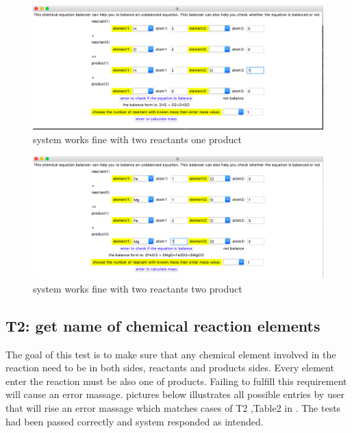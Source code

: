 \documentclass[12pt, titlepage]{article}
\begin{document}
 \begin{figure}[h!]
 \begin{center}
 \includegraphics [width=\textwidth]{ElementNumber3}
 \caption{\label{ Figure 3:} system works fine with two reactants one product}
 \end{center}
 \end{figure}
 
 \begin{figure}[h!]
 \begin{center}
 \includegraphics [width=\textwidth]{ElementNumber4}
 \caption{\label{ Figure 4:} system works fine with two reactants two product}
 \end{center}
 \end{figure}
 
\subsection{T2: get name of chemical reaction elements}

The goal of this test is to make sure that any chemical element involved in the reaction need to be in both sides, reactants and products sides. Every element enter the reaction must be also one of products. Failing to fulfill this requirement will cause an error massage. pictures below illustrates all possible entries by user that will rise an error massage which matches cases of T2 ,Table2 in \cite{UnitVnVPlan}. The tests had been passed correctly and system responded as intended. 
\end{document}
